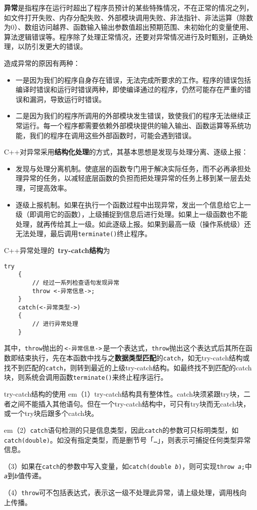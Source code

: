 \documentclass[10pt, a4paper, oneside, fontset=none]{ctexart}
\theoremstyle{plain}
\theoremstyle{definition}
\newcommand{\hang}[1][1]{\hangafter 1 \hangindent #1em}
\newcommand{\zhu}[2][]{\begin{note}{#1}\xiu #2\end{note}}
\newcommand{\tboba}[1]{\textbf{\kai\color{bali!75!black}#1}}
\begin{document}
\tboba{异常}是指程序在运行时超出了程序员预计的某些特殊情况，不在正常的情况之列，如文件打开失败、内存分配失败、外部模块调用失败、非法指针、非法运算（除数为0）、数组访问越界、函数输入输出参数值超出预期范围、未初始化的变量使用、算法逻辑错误等。程序除了处理正常情况，还要对异常情况进行及时甄别，正确处理，以防引发更大的错误。

\kai
造成异常的原因有两种：
\begin{itemize}[topsep=0pt]
	\item 一是因为我们的程序自身存在错误，无法完成所要求的工作。程序的错误包括编译时错误和运行时错误两种，即使编译通过的程序，仍然可能存在严重的错误和漏洞，导致运行时错误。
	\item 二是因为我们的程序所调用的外部模块发生错误，致使我们的程序无法继续正常运行。每一个程序都需要依赖外部模块提供的输入输出、函数运算等系统功能，我们的程序在调用这些外部函数时，可能会遇到错误。
\end{itemize}
C++对异常采用\textbf{结构化处理}的方式，其基本思想是发现与处理分离、逐级上报：
\begin{itemize}[topsep=0pt]
	\item 发现与处理分离机制。使底层的函数专门用于解决实际任务，而不必再承担处理异常的任务，以减轻底层函数的负担而把处理异常的任务上移到某一层去处理，可提高效率。
	\item 逐级上报机制。如果在执行一个函数过程中出现异常，发出一个信息给它上一级（即调用它的函数），上级捕捉到信息后进行处理。如果上一级函数也不能处理，就再传给其上一级。如此逐级上报。如果到最高一级（操作系统级）还无法处理，最后调用\texttt{terminate()}终止程序。
\end{itemize}
\normalfont C++异常处理的~\tboba{try-catch结构}为
\begin{lstlisting}[style=intro]
	try 
	{
		// 经过一系列检查语句发现异常
		throw <-异常信息->;
	}
	catch(<-异常类型->)
	{
		// 进行异常处理
	}
\end{lstlisting}
其中，\texttt{throw}抛出的\,\lstinline[style=intro]|<-异常信息->|\,是一个表达式，\texttt{throw}抛出这个表达式后其所在函数即结束执行，先在本函数中找与之\textbf{数据类型匹配}的\texttt{catch}，如无try-catch结构或找不到匹配的\texttt{catch}，则转到最近的上级try-catch结构。如最终找不到匹配的catch块，则系统会调用函数\texttt{terminate()}来终止程序运行。

\zhu[try-catch结构的使用]{
	\hang[2]（1）try-catch结构具有整体性。catch块须紧跟try块，二者之间不能插入其他语句。但在一个try-catch结构中，可只有try块而无catch块，或一个try块后跟多个catch块。

	\hang[2]（2）\texttt{catch}语句检测的只是信息类型，因此\texttt{catch}的参数可只标明类型，如\texttt{catch(double)}。如没有指定类型，而是删节号「\texttt{…}」，则表示可捕捉任何类型异常信息。
	
	（3）如果在\texttt{catch}的参数中写入变量，如\texttt{catch(double \textit{b})}，则可实现\texttt{throw \textit{a};}中\texttt{\textit{a}}到\texttt{\textit{b}}值传递。
	
	（4）\texttt{throw}可不包括表达式，表示这一级不处理此异常，请上级处理，调用栈向上传播。
}
\end{document}
